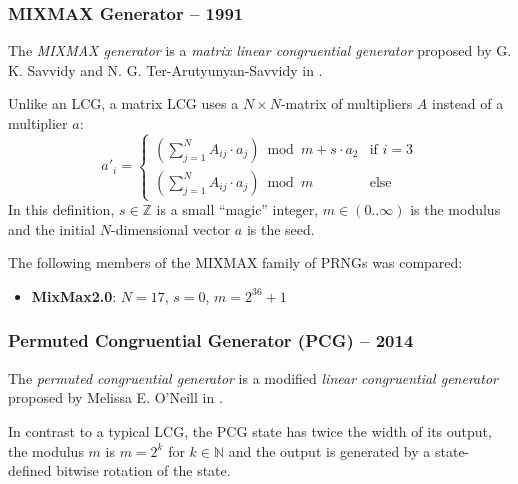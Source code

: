 \subsubsection[MIXMAX Generator -- 1991]{MIXMAX Generator -- 1991} \label{subsubsec:mixmax}

    The \emph{MIXMAX generator} is a \emph{matrix linear congruential generator} proposed by G. K. Savvidy and N. G. Ter-Arutyunyan-Savvidy in \cite{Savvidy:1991}.

    Unlike an LCG, a matrix LCG uses a $N{\times}N$-matrix of multipliers $A$ instead of a multiplier $a$:
    \begin{equation*}
        a'_i = \begin{cases}
                   \left(\sum_{j = 1}^{N} A_{ij} \cdot a_j\right) \bmod m + s \cdot a_2 & \text{if } i = 3 \\
                   \left(\sum_{j = 1}^{N} A_{ij} \cdot a_j\right) \bmod m               & \text{else}
               \end{cases}
    \end{equation*}
    In this definition, $s \in \mathbb{Z}$ is a small ``magic'' integer, $m \in \left(0.. \infty\right)$ is the modulus and the initial $N$-dimensional vector $a$ is the seed.

    The following members of the MIXMAX family of PRNGs was compared:
    \begin{itemize}
		\itemsep0em
        \item \textbf{MixMax2.0}: $N = 17$, $s = 0$, $m = 2^{36} + 1$
    \end{itemize}

\subsubsection[Permuted Congruential Generator (PCG) -- 2014]{Permuted Congruential Generator (PCG) -- 2014} \label{subsubsec:pcg}

    The \emph{permuted congruential generator} is a modified \emph{linear congruential generator} proposed by Melissa E. O'Neill in \cite{ONeill:2014}.

    In contrast to a typical LCG, the PCG state has twice the width of its output, the modulus $m$ is $m = 2^k$ for $k \in \mathbb{N}$ and the output is generated by a state-defined bitwise rotation of the state.

